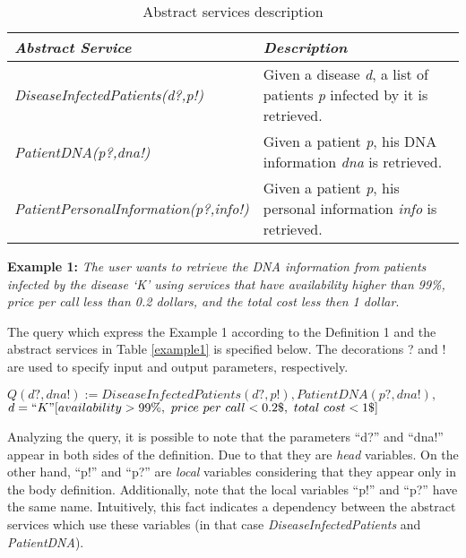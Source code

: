 \begin{table}[h]
\center
\begin{tabular}{|p{7cm}|p{7cm}|}
\hline 
\textbf{\textit{Abstract Service}} & \textbf{\textit{Description}} \\ 
\hline 
\textit{DiseaseInfectedPatients(d?,p!)} & Given a disease \textit{d}, a list of patients \textit{p} infected by it is retrieved. \\ 
\hline 
\textit{PatientDNA(p?,dna!)} & Given a patient \textit{p}, his DNA information \textit{dna} is retrieved. \\ 
\hline 
\textit{PatientPersonalInformation(p?,info!)} & Given a patient \textit{p}, his personal information \textit{info} is retrieved. \\ 
\hline 
\end{tabular} \caption{Abstract services description}
\end{table}\label{example1}


\noindent \textbf{Example 1:} %
\textit{The user wants to retrieve the DNA information from patients infected by the disease `K' using services that have availability higher than 99\%, price per call less than 0.2 dollars, and the total cost less then 1 dollar}.

The query which express the Example 1 according to the Definition 1 and the abstract services in Table \ref{example1} is specified below.
The decorations ? and ! are used to specify input and output parameters, respectively. 

\begin{center}
$Q (d?, dna!) := DiseaseInfectedPatients(d?, p!), PatientDNA(p?, dna!),$ \\
$d = ``K"[availability > 99\%, \ price \ per \ call < 0.2\$, \ total \ cost < 1\$]$
\end{center}  

Analyzing the query, it is possible to note that the parameters ``d?'' and ``dna!'' appear in both sides of the definition.
Due to that they are \textit{head} variables.
On the other hand, ``p!'' and ``p?'' are \textit{local} variables considering that they appear only in the body definition. 
Additionally, note that the local variables ``p!'' and ``p?'' have the same name.
Intuitively, this fact indicates a dependency between the abstract services which use these variables (in that case \textit{DiseaseInfectedPatients} and \textit{PatientDNA}).

